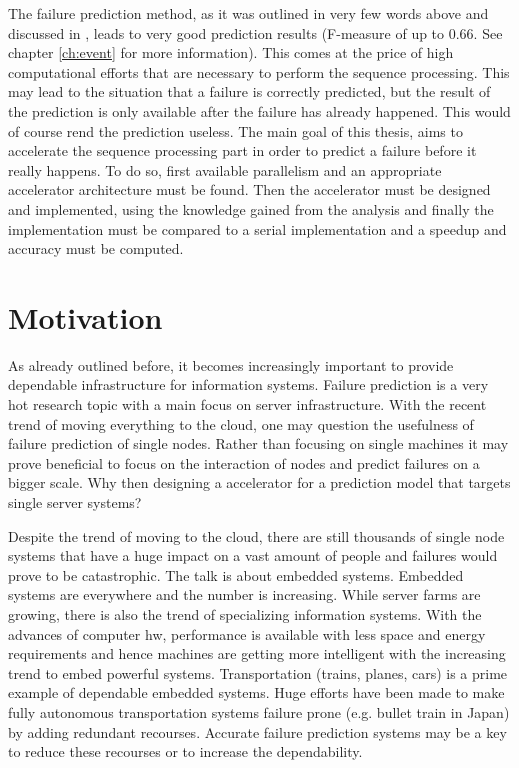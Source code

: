 \documentclass[mscthesis]{usiinfthesis}
\begin{document}
The failure prediction method, as it was outlined in very few words above and
discussed in \cite{salfner08}, leads to very good prediction results (F-measure
of up to 0.66. See chapter \ref{ch:event} for more information). This comes at
the price of high computational efforts that are necessary to perform the
sequence processing. This may lead to the situation that a failure is correctly
predicted, but the result of the prediction is only available after the failure
has already happened. This would of course rend the prediction useless. The
main goal of this thesis, aims to accelerate the sequence processing part in
order to predict a failure before it really happens. To do so, first available
parallelism and an appropriate accelerator architecture must be found. Then the
accelerator must be designed and implemented, using the knowledge gained from
the analysis and finally the implementation must be compared to a serial
implementation and a speedup and accuracy must be computed.

\section{Motivation}
\label{ch:intro_mot}

As already outlined before, it becomes increasingly important to provide
dependable infrastructure for information systems. Failure prediction is a very
hot research topic with a main focus on server infrastructure. With the recent
trend of moving everything to the cloud, one may question the usefulness of
failure prediction of single nodes. Rather than focusing on single machines it
may prove beneficial to focus on the interaction of nodes and predict failures
on a bigger scale. Why then designing a accelerator for a prediction model that
targets single server systems?

Despite the trend of moving to the cloud, there are still thousands of single
node systems that have a huge impact on a vast amount of people and failures
would prove to be catastrophic. The talk is about embedded systems. Embedded
systems are everywhere and the number is increasing. While server farms are
growing, there is also the trend of specializing information systems. With the
advances of computer \gls{hw}, performance is available with less space and
energy requirements and hence machines are getting more intelligent with the
increasing trend to embed powerful systems. Transportation (trains, planes,
cars) is a prime example of dependable embedded systems. Huge efforts have been
made to make fully autonomous transportation systems failure prone (e.g. bullet
train in Japan) by adding redundant recourses. Accurate failure prediction
systems may be a key to reduce these recourses or to increase the
dependability.
\end{document}

